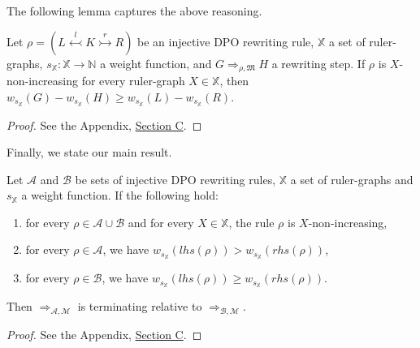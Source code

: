 The following lemma captures the above reasoning.
\begin{lemma}
    \label{lem:w_g_geq_w_h_leq}
    Let $\rho = (L \overset{l}{\leftarrowtail} K \overset{r}{\rightarrowtail} R)$ be an injective DPO rewriting rule,
    \( \mathbb{X} \) a set of ruler-graphs,
    \( s_{\mathbb{X}} \colon \mathbb{X} \to \mathbb{N} \) a weight function,
    and \( G \Rightarrow_{\rho,\mathfrak{M}} H \) a rewriting step. 
    If $\rho$ is \( X \)-non-increasing for every ruler-graph \( X \in \mathbb{X} \), then $
        w_{s_\mathbb{X}}(G) - w_{s_\mathbb{X}}(H) 
        \geq 
        w_{s_\mathbb{X}}(L) - w_{s_\mathbb{X}}(R)
    $.
\end{lemma}
\begin{proof}
    See the Appendix, \hyperref[proof:lem:w_g_geq_w_h_leq]{Section C}.
\end{proof}
Finally, we state our main result.
\begin{theorem}[Termination] 
    \label{thm:termination_grs}
    Let \(\mathcal{A}\) and \(\mathcal{B}\) be sets of injective DPO rewriting rules, $\mathbb{X}$ a set of ruler-graphs and $s_\mathbb{X}$ a weight function. If the following hold:
    \begin{enumerate}
        \item  for every $\rho \in \mathcal{A} \cup \mathcal{B}$ and for every $X \in \mathbb{X}$, the rule $\rho$ is $X$-non-increasing,
        \item for every \(\rho \in \mathcal{A}\), we have \( w_{s_\mathbb{X}}(lhs(\rho)) > w_{s_\mathbb{X}}(rhs(\rho)) \),
        \item for every \(\rho \in \mathcal{B}\), we have \( w_{s_\mathbb{X}}(lhs(\rho)) \geq w_{s_\mathbb{X}}(rhs(\rho)) \).
    \end{enumerate}
    Then \(\Rightarrow_{\mathcal{A},\mathcal{M}}\) is terminating relative to \(\Rightarrow_{\mathcal{B},\mathcal{M}}\).
\end{theorem}
\begin{proof}
    See the Appendix, \hyperref[proof:thm:termination_grs]{Section C}.
\end{proof}